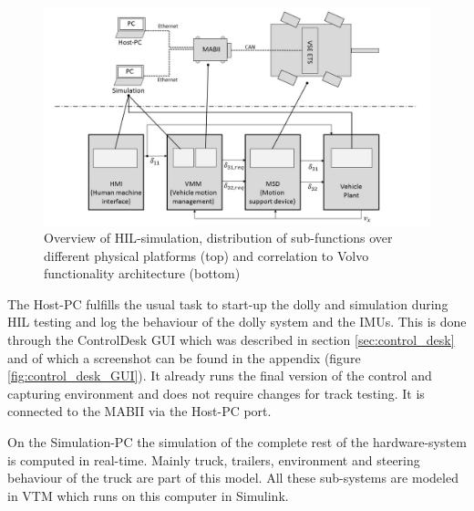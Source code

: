 \documentclass[ExampleMasters.tex]{subfiles}
\begin{document}
\begin{figure}[h]
	\centering
	\includegraphics[width=1\linewidth]{figures/HIL_overview}
	\caption[Overview of \acrlong{HIL}-simulation, distribution of sub-functions over different physical platforms (top) and correlation to Volvo functionality architecture (bottom)]{Overview of \gls{HIL}-simulation, distribution of sub-functions over different physical platforms (top) and correlation to Volvo functionality architecture (bottom)}
	
	\label{fig:HIL_overview}
\end{figure}


The Host-PC fulfills the usual task to start-up the dolly and simulation during \gls{HIL}  testing and log the behaviour of the dolly system and the \gls{IMU}s. This is done through the ControlDesk \gls{GUI} which was described in section \ref{sec:control_desk} and of which a screenshot can be found in the appendix (figure \ref{fig:control_desk_GUI}). It already runs the final version of the control and capturing environment and does not require changes for track testing. It is connected to the \gls{MABII} via the Host-PC port.

On the Simulation-PC the simulation of the complete rest of the hardware-system is computed in real-time. Mainly truck, trailers, environment and steering behaviour of the truck are part of this model. All these sub-systems are modeled in \gls{VTM}  which runs on this computer in Simulink. 
\end{document}
